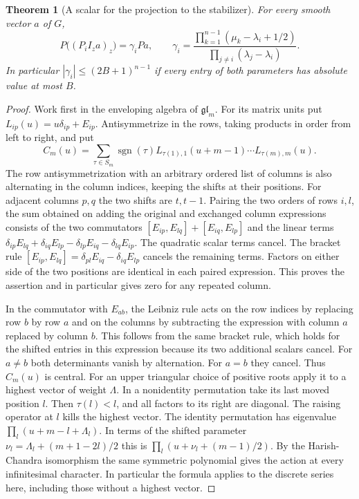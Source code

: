 \documentclass[a4paper,11pt]{article}
\newtheorem{theorem}[proposition]{Theorem}
\theoremstyle{definition}
\theoremstyle{remark}
\numberwithin{equation}{section}
\begin{document}
\begin{theorem}[A scalar for the projection to the stabilizer]
\label{thm:capelli250}
For every smooth vector \(a\) of \(G\),
\[
 P\bigl((P_i I_z a)_z\bigr)=\gamma_i Pa,\qquad
 \gamma_i=\frac{\prod_{k=1}^{n-1}(\mu_k-\lambda_i+1/2)}
                   {\prod_{j\ne i}(\lambda_j-\lambda_i)} .
\]
In particular \(|\gamma_i|\le(2B+1)^{n-1}\) if every entry of
both parameters has absolute value at most \(B\).
\end{theorem}
\begin{proof}
Work first in the enveloping algebra of \(\mathfrak{gl}_m\). For its
matrix units put \(L_{ip}(u)=u\delta_{ip}+E_{ip}\). Antisymmetrize
in the rows, taking products in order from left to right, and put
\[
 C_m(u)=\sum_{\tau\in S_m}\operatorname{sgn}(\tau)
       L_{\tau(1),1}(u+m-1)\cdots L_{\tau(m),m}(u).
\]
The row antisymmetrization with an arbitrary ordered list of columns
is also alternating in the column indices, keeping the shifts at their
positions. For adjacent columns \(p,q\) the two shifts are \(t,t-1\).
Pairing the two orders of rows \(i,l\), the sum obtained on adding the
original and exchanged column expressions consists of the two commutators
\([E_{ip},E_{lq}]+[E_{iq},E_{lp}]\) and the linear terms
\(\delta_{ip}E_{lq}+\delta_{iq}E_{lp}-\delta_{lp}E_{iq}-\delta_{lq}E_{ip}\).
The quadratic scalar terms cancel. The bracket rule
\([E_{ip},E_{lq}]=\delta_{pl}E_{iq}-\delta_{iq}E_{lp}\) cancels the
remaining terms. Factors on either side of the two positions are
identical in each paired expression. This proves the assertion and in
particular gives zero for any repeated column.

In the commutator with \(E_{ab}\), the Leibniz rule acts on the row
indices by replacing row \(b\) by row \(a\) and on the columns by
subtracting the expression with column \(a\) replaced by column \(b\).
This follows from the same bracket rule, which holds for the shifted
entries in this expression because its two additional scalars cancel.
For \(a\ne b\) both determinants vanish by alternation. For \(a=b\)
they cancel. Thus \(C_m(u)\) is central. For an upper triangular choice
of positive roots apply it to a highest vector of weight \(\Lambda\).
In a nonidentity permutation take its last moved position \(l\). Then
\(\tau(l)<l\), and all factors to its right are diagonal. The raising
operator at \(l\) kills the highest vector. The identity permutation
has eigenvalue \(\prod_l(u+m-l+\Lambda_l)\). In terms of the shifted
parameter \(\nu_l=\Lambda_l+(m+1-2l)/2\) this is
\(\prod_l(u+\nu_l+(m-1)/2)\). By the Harish-Chandra isomorphism the
same symmetric polynomial gives the action at every infinitesimal
character. In particular the formula applies to the discrete series
here, including those without a highest vector.


\end{proof}
\end{document}
